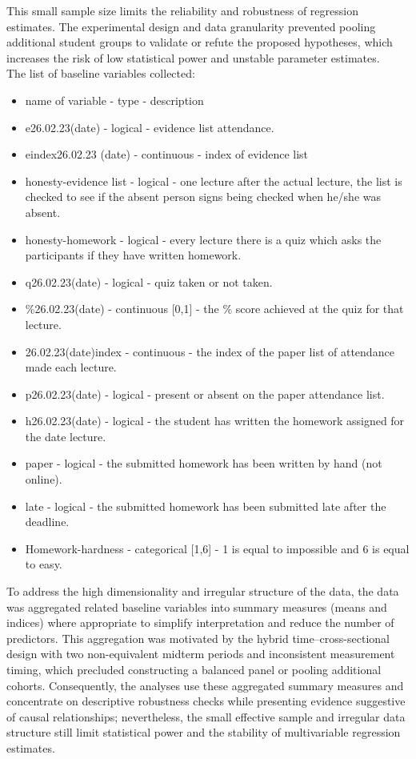 \documentclass[]{article}
\begin{document}
	This small sample size limits the reliability and robustness of regression estimates. The experimental design and data granularity prevented pooling additional student groups to validate or refute the proposed hypotheses, which increases the risk of low statistical power and unstable parameter estimates.\\
	
	The list of baseline variables collected:
	\begin{itemize}
		\item [] name of variable - type - description
		\item e26.02.23(date) - logical - evidence list attendance.
		\item eindex26.02.23 (date) - continuous - index of evidence list
		\item honesty-evidence list - logical - one lecture after the actual lecture, the list is checked to see if the absent person signs being checked when he/she was absent.
		\item honesty-homework - logical - every lecture there is a quiz which asks the participants if they have written homework.
		\item q26.02.23(date) - logical - quiz taken or not taken.
		\item \%26.02.23(date) - continuous [0,1] - the \% score achieved at the quiz for that lecture.
		\item 26.02.23(date)index - continuous - the index of the paper list of attendance made each lecture.
		\item p26.02.23(date) - logical - present or absent on the paper attendance list.
		\item h26.02.23(date) - logical - the student has written the homework assigned for the date lecture.
		\item paper - logical - the submitted homework has been written by hand (not online).
		\item late - logical - the submitted homework has been submitted late after the deadline.
		\item Homework-hardness - categorical [1,6] - 1 is equal to impossible and 6 is equal to easy.
	\end{itemize}
	\vspace{1em}
	
	To address the high dimensionality and irregular structure of the data, the data was aggregated related baseline variables into summary measures (means and indices) where appropriate to simplify interpretation and reduce the number of predictors. This aggregation was motivated by the hybrid time–cross-sectional design with two non-equivalent midterm periods and inconsistent measurement timing, which precluded constructing a balanced panel or pooling additional cohorts. Consequently, the analyses use these aggregated summary measures and concentrate on descriptive robustness checks while presenting evidence suggestive of causal relationships; nevertheless, the small effective sample and irregular data structure still limit statistical power and the stability of multivariable regression estimates.
	
\end{document}
